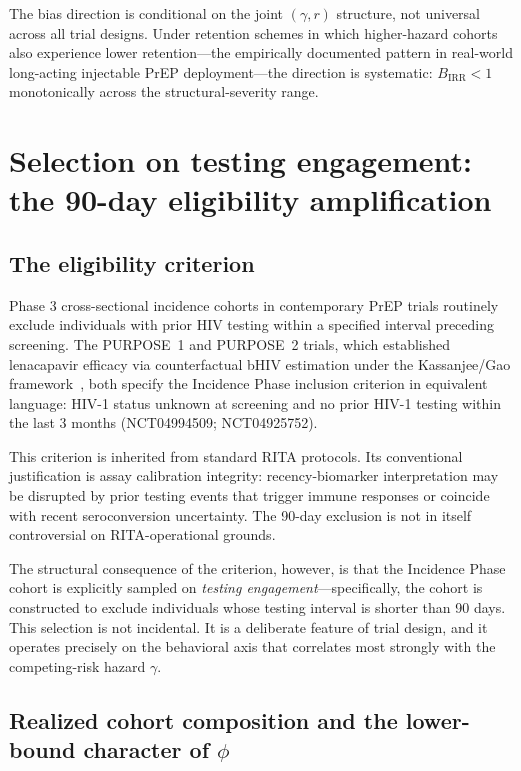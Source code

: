 \documentclass[11pt]{article}
\begin{document}
The bias direction is conditional on the joint $(\gamma, r)$ structure, not universal across all trial designs. Under retention schemes in which higher-hazard cohorts also experience lower retention---the empirically documented pattern in real-world long-acting injectable PrEP deployment---the direction is systematic: $B_{\mathrm{IRR}} < 1$ monotonically across the structural-severity range.

\section{Selection on testing engagement: the 90-day eligibility amplification}

\subsection{The eligibility criterion}

Phase 3 cross-sectional incidence cohorts in contemporary PrEP trials routinely exclude individuals with prior HIV testing within a specified interval preceding screening. The PURPOSE~1 and PURPOSE~2 trials, which established lenacapavir efficacy via counterfactual bHIV estimation under the Kassanjee/Gao framework~\cite{bekker2024,kelley2025}, both specify the Incidence Phase inclusion criterion in equivalent language: HIV-1 status unknown at screening and no prior HIV-1 testing within the last 3 months (NCT04994509; NCT04925752).

This criterion is inherited from standard RITA protocols. Its conventional justification is assay calibration integrity: recency-biomarker interpretation may be disrupted by prior testing events that trigger immune responses or coincide with recent seroconversion uncertainty. The 90-day exclusion is not in itself controversial on RITA-operational grounds.

The structural consequence of the criterion, however, is that the Incidence Phase cohort is explicitly sampled on \emph{testing engagement}---specifically, the cohort is constructed to exclude individuals whose testing interval is shorter than 90 days. This selection is not incidental. It is a deliberate feature of trial design, and it operates precisely on the behavioral axis that correlates most strongly with the competing-risk hazard $\gamma$.

\subsection{Realized cohort composition and the lower-bound character of \texorpdfstring{$\phi$}{phi}}
\end{document}
